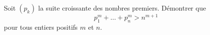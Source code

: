 Soit $(p_k)$ la suite croissante des nombres premiers. Démontrer que
$$p_1^m + \dots + p_n^m > n^{m + 1}$$
pour tous entiers positifs $m$ et $n$.